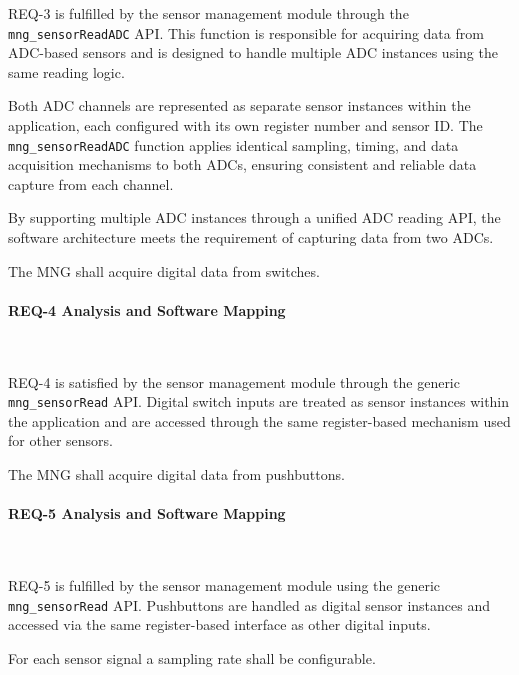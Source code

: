 \documentclass{article}
\begin{document}
REQ-3 is fulfilled by the sensor management module through the \texttt{mng\_sensorReadADC} 
API. This function is responsible for acquiring data from ADC-based sensors and is 
designed to handle multiple ADC instances using the same reading logic.

Both ADC channels are represented as separate sensor instances within the 
application, each configured with its own register number and sensor ID. The 
\texttt{mng\_sensorReadADC} function applies identical sampling, timing, and data acquisition 
mechanisms to both ADCs, ensuring consistent and reliable data capture from each 
channel.

By supporting multiple ADC instances through a unified ADC reading API, the software 
architecture meets the requirement of capturing data from two ADCs.


\begin{tcolorbox}[
    title=REQ-4,
    colback=gray!5,
    colframe=black,
    fonttitle=\bfseries
]
The MNG shall acquire digital data from switches.
\end{tcolorbox}

\paragraph{REQ-4 Analysis and Software Mapping}\

REQ-4 is satisfied by the sensor management module through the generic 
\texttt{mng\_sensorRead}  API. Digital switch inputs are treated as sensor instances within 
the application and are accessed through the same register-based mechanism used 
for other sensors.


\begin{tcolorbox}[
    title=REQ-5,
    colback=gray!5,
    colframe=black,
    fonttitle=\bfseries
]
The MNG shall acquire digital data from pushbuttons.
\end{tcolorbox}

\paragraph{REQ-5 Analysis and Software Mapping}\

REQ-5 is fulfilled by the sensor management module using the generic \texttt{mng\_sensorRead} 
API. Pushbuttons are handled as digital sensor instances and accessed via the 
same register-based interface as other digital inputs.


\begin{tcolorbox}[
    title=REQ-6,
    colback=gray!5,
    colframe=black,
    fonttitle=\bfseries
]
For each sensor signal a sampling rate shall be configurable.
\end{tcolorbox}
\end{document}
